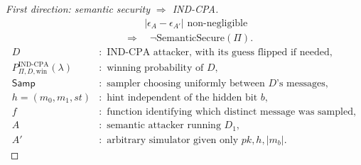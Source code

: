\documentclass[12pt,a4paper]{article}
\begin{document}
\begin{proof}[First direction: semantic security $\Longrightarrow$ IND-CPA]
\[\begin{aligned}
&\qquad|\epsilon_A-\epsilon_{A'}|\text{ non-negligible}\\
&\Longrightarrow\quad\neg\mathrm{SemanticSecure}(\Pi).
\end{aligned}
\]
\[
\begin{aligned}
D&:\text{ IND-CPA attacker, with its guess flipped if needed},\\
P_{\Pi,D,\mathrm{win}}^{\mathrm{IND\text{-}CPA}}(\lambda)&:\text{ winning probability of }D,\\
\mathsf{Samp}&:\text{ sampler choosing uniformly between }D\text{'s messages},\\
h=(m_0,m_1,st)&:\text{ hint independent of the hidden bit }b,\\
f&:\text{ function identifying which distinct message was sampled},\\
A&:\text{ semantic attacker running }D_1,\\
A'&:\text{ arbitrary simulator given only }pk,h,|m_b|.
\end{aligned}
\]
\end{proof}
\end{document}
